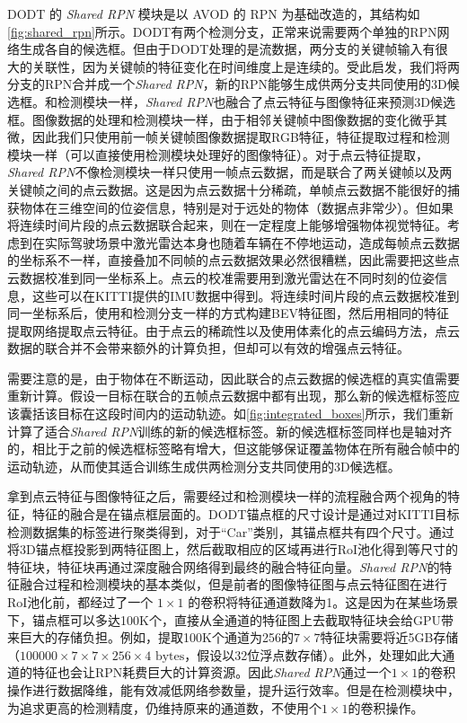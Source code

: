 DODT 的 \textit{Shared RPN} 模块是以 AVOD 的 RPN 为基础改造的，其结构如\figurename \ref{fig:shared_rpn}所示。DODT有两个检测分支，正常来说需要两个单独的RPN网络生成各自的候选框。但由于DODT处理的是流数据，两分支的关键帧输入有很大的关联性，因为关键帧的特征变化在时间维度上是连续的。受此启发，我们将两分支的RPN合并成一个\textit{Shared RPN}，新的RPN能够生成供两分支共同使用的3D候选框。和检测模块一样，\textit{Shared RPN}也融合了点云特征与图像特征来预测3D候选框。图像数据的处理和检测模块一样，由于相邻关键帧中图像数据的变化微乎其微，因此我们只使用前一帧关键帧图像数据提取RGB特征，特征提取过程和检测模块一样（可以直接使用检测模块处理好的图像特征）。对于点云特征提取，\textit{Shared RPN}不像检测模块一样只使用一帧点云数据，而是联合了两关键帧以及两关键帧之间的点云数据。这是因为点云数据十分稀疏，单帧点云数据不能很好的捕获物体在三维空间的位姿信息，特别是对于远处的物体（数据点非常少）。但如果将连续时间片段的点云数据联合起来，则在一定程度上能够增强物体视觉特征。考虑到在实际驾驶场景中激光雷达本身也随着车辆在不停地运动，造成每帧点云数据的坐标系不一样，直接叠加不同帧的点云数据效果必然很糟糕，因此需要把这些点云数据校准到同一坐标系上。点云的校准需要用到激光雷达在不同时刻的位姿信息，这些可以在KITTI提供的IMU数据中得到。将连续时间片段的点云数据校准到同一坐标系后，使用和检测分支一样的方式构建BEV特征图，然后用相同的特征提取网络提取点云特征。由于点云的稀疏性以及使用体素化的点云编码方法，点云数据的联合并不会带来额外的计算负担，但却可以有效的增强点云特征。



需要注意的是，由于物体在不断运动，因此联合的点云数据的候选框的真实值需要重新计算。假设一目标在联合的五帧点云数据中都有出现，那么新的候选框标签应该囊括该目标在这段时间内的运动轨迹。如\figurename \ref{fig:integrated_boxes}所示，我们重新计算了适合\textit{Shared RPN}训练的新的候选框标签。新的候选框标签同样也是轴对齐的，相比于之前的候选框标签略有增大，但这能够保证覆盖物体在所有融合帧中的运动轨迹，从而使其适合训练生成供两检测分支共同使用的3D候选框。

拿到点云特征与图像特征之后，需要经过和检测模块一样的流程融合两个视角的特征，特征的融合是在锚点框层面的。DODT锚点框的尺寸设计是通过对KITTI目标检测数据集的标签进行聚类得到，对于“Car”类别，其锚点框共有四个尺寸。通过将3D锚点框投影到两特征图上，然后截取相应的区域再进行RoI池化得到等尺寸的特征块，特征块再通过深度融合网络得到最终的融合特征向量。\textit{Shared RPN}的特征融合过程和检测模块的基本类似，但是前者的图像特征图与点云特征图在进行RoI池化前，都经过了一个 $1 \times 1$ 的卷积将特征通道数降为1。这是因为在某些场景下，锚点框可以多达100K个，直接从全通道的特征图上去截取特征块会给GPU带来巨大的存储负担。例如，提取100K个通道为256的$7 \times 7$特征块需要将近5GB存储（$100000 \times 7 \times 7 \times 256 \times 4 \text{ bytes}$，假设以32位浮点数存储）。此外，处理如此大通道的特征也会让RPN耗费巨大的计算资源。因此\textit{Shared RPN}通过一个$1 \times 1$的卷积操作进行数据降维，能有效减低网络参数量，提升运行效率。但是在检测模块中，为追求更高的检测精度，仍维持原来的通道数，不使用个$1 \times 1$的卷积操作。

